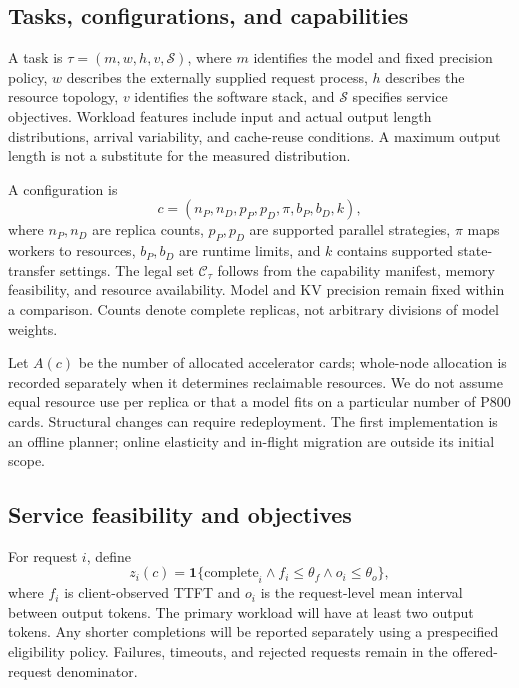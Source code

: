 \documentclass[11pt,a4paper]{article}
\begin{document}
\subsection{Tasks, configurations, and capabilities}
A task is $\tau=(m,w,h,v,\mathcal{S})$, where $m$ identifies the model and fixed precision policy, $w$ describes the externally supplied request process, $h$ describes the resource topology, $v$ identifies the software stack, and $\mathcal{S}$ specifies service objectives. Workload features include input and actual output length distributions, arrival variability, and cache-reuse conditions. A maximum output length is not a substitute for the measured distribution.

A configuration is
\begin{equation}
 c=(n_P,n_D,p_P,p_D,\pi,b_P,b_D,k),
\end{equation}
where $n_P,n_D$ are replica counts, $p_P,p_D$ are supported parallel strategies, $\pi$ maps workers to resources, $b_P,b_D$ are runtime limits, and $k$ contains supported state-transfer settings. The legal set $\mathcal{C}_{\tau}$ follows from the capability manifest, memory feasibility, and resource availability. Model and KV precision remain fixed within a comparison. Counts denote complete replicas, not arbitrary divisions of model weights.

Let $A(c)$ be the number of allocated accelerator cards; whole-node allocation is recorded separately when it determines reclaimable resources. We do not assume equal resource use per replica or that a model fits on a particular number of P800 cards. Structural changes can require redeployment. The first implementation is an offline planner; online elasticity and in-flight migration are outside its initial scope.

\subsection{Service feasibility and objectives}
For request $i$, define
\begin{equation}
 z_i(c)=\mathbf{1}\{\text{complete}_i \land f_i\leq\theta_f
                  \land o_i\leq\theta_o\},
\end{equation}
where $f_i$ is client-observed TTFT and $o_i$ is the request-level mean interval between output tokens. The primary workload will have at least two output tokens. Any shorter completions will be reported separately using a prespecified eligibility policy. Failures, timeouts, and rejected requests remain in the offered-request denominator.
\end{document}
